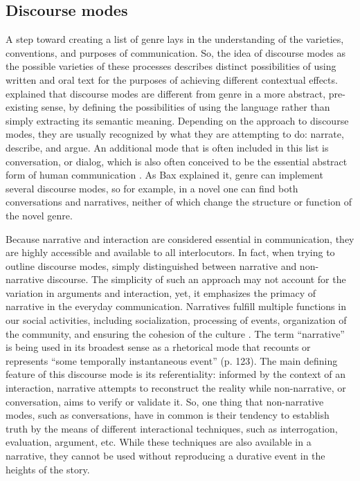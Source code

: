 \documentclass[12pt]{article}
\begin{document}
\subsection{Discourse modes}
A step toward creating a list of genre lays in the understanding of the varieties, conventions, and purposes of communication. So, the idea of discourse modes as the possible varieties of these processes describes distinct possibilities of using written and oral text for the purposes of achieving different contextual effects. \textcite[p. 54]{bax2011} explained that discourse modes are different from genre in a more abstract, pre-existing sense, by defining the possibilities of using the language rather than simply extracting its semantic meaning. Depending on the approach to discourse modes, they are usually recognized by what they are attempting to do: narrate, describe, and argue. An additional mode that is often included in this list is conversation, or dialog, which is also often conceived to be the essential abstract form of human communication \parencite{bakhtin1986, bax2011}. As Bax explained it, genre can implement several discourse modes, so for example, in a novel one can find both conversations and narratives, neither of which change the structure or function of the novel genre.

Because narrative and interaction are considered essential in communication, they are highly accessible and available to all interlocutors.  In fact, when trying to outline discourse modes, \textcite{georgakopoulou2000} simply distinguished between narrative and non-narrative discourse. The simplicity of such an approach may not account for the variation in arguments and interaction, yet, it emphasizes the primacy of narrative in the everyday communication. Narratives fulfill multiple functions in our social activities, including socialization, processing of events, organization of the community, and ensuring the cohesion of the culture \parencite{georgakopoulou2000}. The term ``narrative'' is being used in its broadest sense as a rhetorical mode that recounts or represents ``some temporally instantaneous event'' (p. 123). The main defining feature of this discourse mode is its referentiality: informed by the context of an interaction, narrative attempts to reconstruct the reality while non-narrative, or conversation, aims to verify or validate it. So, one thing that non-narrative modes, such as conversations, have in common is their tendency to establish truth by the means of different interactional techniques, such as interrogation, evaluation, argument, etc. While these techniques are also available in a narrative, they cannot be used without reproducing a durative event in the heights of the story. 
\end{document}
